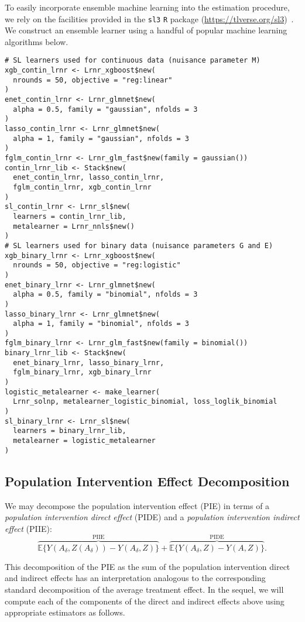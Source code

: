 To easily incorporate ensemble machine learning into the estimation procedure,
we rely on the facilities provided in the \texttt{sl3} \texttt{R}
package (\url{https://tlverse.org/sl3})~\citep{coyle2021sl3}.
We construct an ensemble learner using a handful of popular machine learning
algorithms below.

\begin{lstlisting}
# SL learners used for continuous data (nuisance parameter M)
xgb_contin_lrnr <- Lrnr_xgboost$new(
  nrounds = 50, objective = "reg:linear"
)
enet_contin_lrnr <- Lrnr_glmnet$new(
  alpha = 0.5, family = "gaussian", nfolds = 3
)
lasso_contin_lrnr <- Lrnr_glmnet$new(
  alpha = 1, family = "gaussian", nfolds = 3
)
fglm_contin_lrnr <- Lrnr_glm_fast$new(family = gaussian())
contin_lrnr_lib <- Stack$new(
  enet_contin_lrnr, lasso_contin_lrnr,
  fglm_contin_lrnr, xgb_contin_lrnr
)
sl_contin_lrnr <- Lrnr_sl$new(
  learners = contin_lrnr_lib,
  metalearner = Lrnr_nnls$new()
)
# SL learners used for binary data (nuisance parameters G and E)
xgb_binary_lrnr <- Lrnr_xgboost$new(
  nrounds = 50, objective = "reg:logistic"
)
enet_binary_lrnr <- Lrnr_glmnet$new(
  alpha = 0.5, family = "binomial", nfolds = 3
)
lasso_binary_lrnr <- Lrnr_glmnet$new(
  alpha = 1, family = "binomial", nfolds = 3
)
fglm_binary_lrnr <- Lrnr_glm_fast$new(family = binomial())
binary_lrnr_lib <- Stack$new(
  enet_binary_lrnr, lasso_binary_lrnr,
  fglm_binary_lrnr, xgb_binary_lrnr
)
logistic_metalearner <- make_learner(
  Lrnr_solnp, metalearner_logistic_binomial, loss_loglik_binomial
)
sl_binary_lrnr <- Lrnr_sl$new(
  learners = binary_lrnr_lib,
  metalearner = logistic_metalearner
)
\end{lstlisting}

\subsection{Population Intervention Effect Decomposition}

We may decompose the population intervention effect (PIE) in terms of a
\textit{population intervention direct effect} (PIDE) and a \textit{population
intervention indirect effect} (PIIE):
\begin{equation*}
  \overbrace{\mathbb{E}\{Y(A_\delta, Z(A_\delta)) -
    Y(A_\delta, Z)\}}^{\text{PIIE}} +
    \overbrace{\mathbb{E}\{Y(A_\delta, Z) - Y(A, Z)\}}^{\text{PIDE}}.
\end{equation*}

This decomposition of the PIE as the sum of the population intervention direct
and indirect effects has an interpretation analogous to the corresponding
standard decomposition of the average treatment effect. In the sequel, we will
compute each of the components of the direct and indirect effects above using
appropriate estimators as follows.

